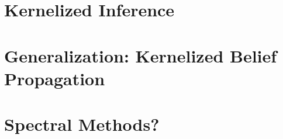 \documentclass{article}
\begin{document}
\section{Kernelized Inference}

\section{Generalization: Kernelized Belief Propagation}

\section{Spectral Methods?}




\begin{appendix}
\begin{comment}
\section{Gradient Estimator Implementation}
In the log-semiring, addition is given by $\bigoplus = \LSE$ and multiplication
by $\bigotimes = +$.
Consider the linear chain CRF, $\bigotimes_t \psi(x_{t-1}, x_t)$,
with $\psi(x_{t-1}, t) = f(x_t) \oplus g(x_{t-1},x_t)$.
We would like to compute the gradient of the
log partition function, $A = \bigoplus_x \bigotimes_t \psi(x_{t-1}, x_t)$.
Recall the gradient identities 
\begin{equation}
\begin{aligned}
\nabla_a a \bigoplus b &= \frac{\exp(a)}{\exp(a \bigoplus b)}\\
\nabla_a a \bigotimes b &= 1.
\end{aligned}
\end{equation}

We then have 
\begin{equation}
\begin{aligned}
\nabla_{\psi(x_a,x_b)} &\bigoplus_t \psi(x_{t-1}, x_t)\\
&= \nabla_{\psi(x_a,x_b)} \bigoplus_t \psi(x_{t-1}, x_t)\\
\end{aligned}
\end{equation}
\end{comment}

\end{appendix}
\end{document}
